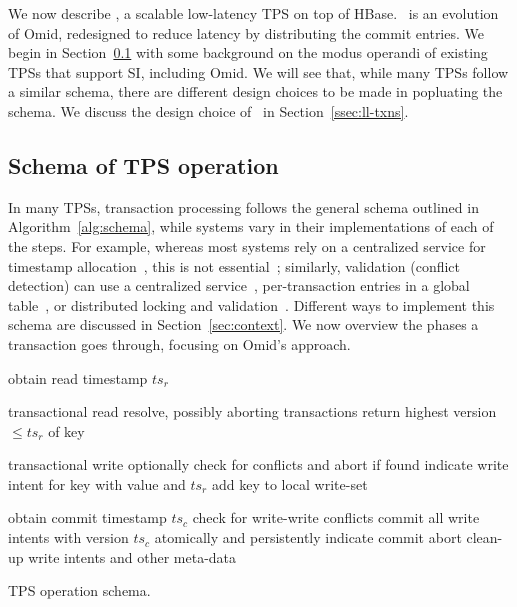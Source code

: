 

We now describe \sys, a scalable low-latency TPS on top of HBase. 
\sys\ is an evolution of Omid, redesigned to reduce latency by distributing the commit entries.
We begin in Section~\ref{ssec:schema} with some background on the modus operandi of existing TPSs that support SI, including Omid. 
We will see that, while many TPSs follow a similar schema,  there are different design choices to be made in popluating the schema. 
We discuss the design choice of \sys\ in Section~\ref{ssec:ll-txns}. 

\subsection{Schema of TPS operation}
\label{ssec:schema}


In many TPSs, transaction processing follows the general schema outlined in Algorithm~\ref{alg:schema}, 
while systems vary in their implementations of each of the steps. 
For example, whereas most systems rely on a centralized service for timestamp allocation~\cite{OmidICDE2014,omid-fast,tephra,Percolator2010}, this is not essential~\cite{cockroach}; similarly, validation (conflict detection) can use a centralized service~\cite{OmidICDE2014,omid-fast,tephra}, per-transaction entries in a global table~\cite{cockroach}, or distributed locking and validation~\cite{Percolator2010}. 
Different ways to implement this schema are  discussed in Section~\ref{sec:context}.
We now overview the phases a transaction goes through, focusing on Omid's approach.

\begin{algorithm}[tb]
\begin{algorithmic}[1]
\State obtain read timestamp $ts_r$ 
\EndProcedure
\Statex

 \Comment transactional read
	\State resolve, possibly  aborting transactions \label{l:resolve}
\EndIf
\State return highest version   $\le ts_r$ of key
\EndProcedure
\Statex

 \Comment transactional write
\State optionally check for conflicts and abort if found 
\State indicate write intent for key with value and $ts_r$
\State add key to local write-set
\EndProcedure
\Statex

\State obtain commit timestamp $ts_c$
\Statex \Comment check for write-write conflicts  \label{l:validate}
	\Statex \Comment commit all write intents with version $ts_c$
	\State atomically and persistently indicate commit   \label{l:commit}
\Else
	\State abort	
\EndIf
\State clean-up write intents and other meta-data
\EndProcedure
\end{algorithmic}
\caption{TPS operation schema.} 
\label{alg:schema}
\end{algorithm} 


